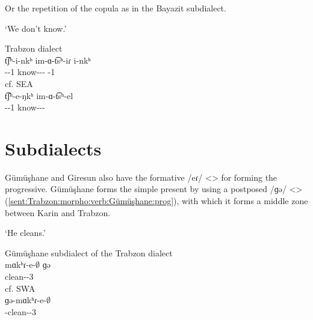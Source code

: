 Or the repetition of the copula as in the Bayazit subdialect. 


\newpage
\begin{exe}
	
	\ex `We don't know.' \label{sent:Trabzon:morpho:verb:negRepetCop}
	\begin{xlist}
		\ex Trabzon dialect \\
		\gll t͡ʃʰ-i-nkʰ im-ɑ-t͡sʰ-iɾ i-nkʰ\\
		{\neggloss}-{\aux}-1{\pl} know-{\lvgloss}-{\aor}-{\perfcvb} {\aux}-1{\pl} \\
		\trans {}
		\ex cf. SEA \\
		\gll t͡ʃʰ-e-ŋkʰ im-ɑ-t͡sʰ-el \\
		{\neggloss}-{\aux}-1{\pl} know-{\lvgloss}-{\aor}-{\perfcvb} \\
		\trans {}
	\end{xlist}
	
\end{exe}

\section{Subdialects}
Gümüşhane and Giresun also have the formative /eɾ/ <> for forming the progressive. Gümüşhane forms the simple present by using a postposed /ɡə/ <> (\ref{sent:Trabzon:morpho:verb:Gümüşhane:prog}), with which it forms a middle zone between Karin and Trabzon. 


\begin{exe}
	
	\ex `He cleans.' \label{sent:Trabzon:morpho:verb:Gümüşhane:prog}
	\begin{xlist}
		\ex Gümüşhane subdialect of the Trabzon dialect \\
		\gll mɑkʰɾ-e-$\emptyset$ ɡə\\
		clean-{\thgloss}-3{\sg} {\ind} \\
		\trans \armenian{մաքրէ գը}
		\ex cf. SWA 
		\\
		ɡə-mɑkʰɾ-e-$\emptyset$ \\
		{\ind}-clean-{\thgloss}-3{\sg}\\
		\armenian{կը մաքրէ}
	\end{xlist}
\end{exe}


